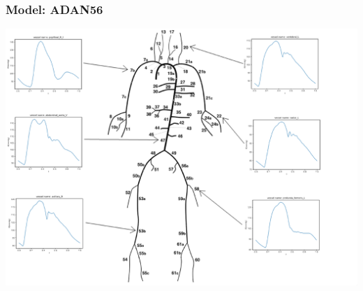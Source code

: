 \documentclass{beamer}
\begin{document}
\begin{frame}
	\frametitle{Model: ADAN56}
	\includegraphics[width=\textwidth]{images/adan56.eps}
\end{frame}
\end{document}
